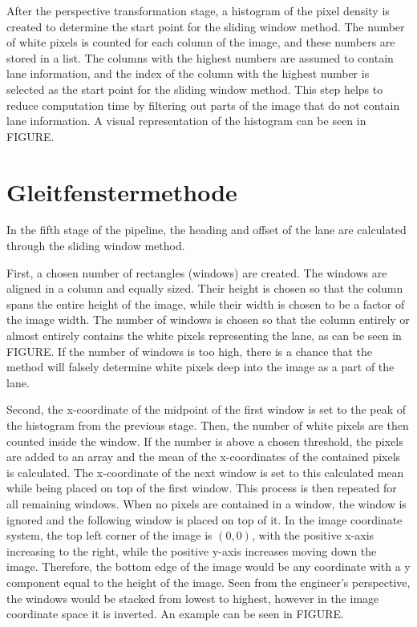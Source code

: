 \documentclass[arbeit=studie,oneside,BCOR=12mm]{ArbeitRST}
\begin{document}
\fi

After the perspective transformation stage, a histogram of the pixel density is
created to determine the start point for the sliding window method. The number
of white pixels is counted for each column of the image, and these numbers are
stored in a list. The columns with the highest numbers are assumed to contain
lane information, and the index of the column with the highest number is
selected as the start point for the sliding window method. This step helps to
reduce computation time by filtering out parts of the image that do not contain
lane information. A visual representation of the histogram can be seen in
FIGURE.

\section{Gleitfenstermethode}


In the fifth stage of the pipeline, the heading and offset of the lane are
calculated through the sliding window method.

First, a chosen number of rectangles (windows) are created. The windows are
aligned in a column and equally sized. Their height is chosen so that the
column spans the entire height of the image, while their width is chosen to be
a factor of the image width. The number of windows is chosen so that the column
entirely or almost entirely  contains the white pixels representing the lane,
as can be seen in FIGURE. If the number of windows is too high, there is a
chance that the method will falsely determine white pixels deep into the image
as a part of the lane. 

Second, the x-coordinate of the midpoint of the first window is set to the peak
of the histogram from the previous stage. Then, the number of white pixels are
then counted inside the window. If the number is above a chosen threshold, the
pixels are added to an array and the mean of the x-coordinates of the contained
pixels is calculated. The x-coordinate of the next window is set to this
calculated mean while being placed on top of the first window. This process is
then repeated for all remaining windows. When no pixels are contained in a
window, the window is ignored and the following window is placed on top of it.
In the image coordinate system, the top left corner of the image is $(0, 0)$,
with the positive x-axis increasing to the right, while the positive y-axis
increases moving down the image. Therefore, the bottom edge of the image would
be any coordinate with a y component equal to the height of the image. Seen
from the engineer's perspective, the windows would be stacked from lowest to
highest, however in the image coordinate space it is inverted. An example can
be seen in FIGURE.
\end{document}
